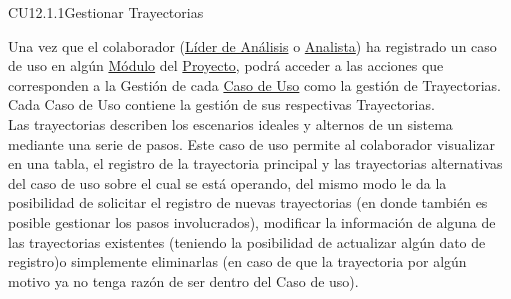	\begin{UseCase}{CU12.1.1}{Gestionar Trayectorias}{
			
				Una vez que el colaborador (\hyperlink{jefe}{Líder de Análisis} o \hyperlink{analista}{Analista}) ha registrado un caso de uso en algún \hyperlink{moduloEntidad}{Módulo} del \hyperlink{proyectoEntidad}{Proyecto}, podrá acceder a las acciones que corresponden a la Gestión de cada \hyperlink{casoUso}{Caso de Uso} como la gestión de Trayectorias.  Cada Caso de Uso contiene la gestión de sus respectivas Trayectorias.\\
				
				Las trayectorias describen los escenarios ideales y alternos de un sistema mediante una serie de pasos. Este caso de uso permite al colaborador visualizar en una tabla, el registro de la trayectoria principal y las trayectorias alternativas del caso de uso sobre el cual se está operando, del mismo modo le da la posibilidad de solicitar el registro de nuevas trayectorias (en donde también es posible gestionar los pasos involucrados), modificar la información de alguna de las trayectorias existentes (teniendo la posibilidad de actualizar algún dato de registro)o simplemente eliminarlas (en caso de que la trayectoria por algún motivo ya no tenga razón de ser dentro del Caso de uso). \\
				
}
\end{UseCase}
